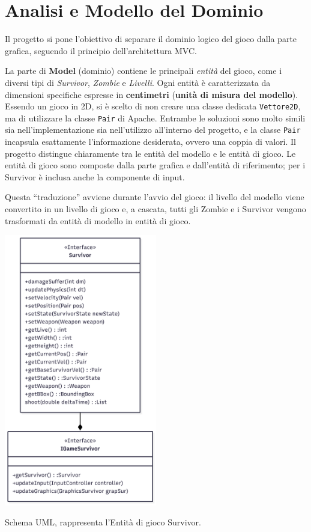 \documentclass[a4paper,12pt]{report}
\begin{document}
\section{Analisi e Modello del Dominio}

Il progetto si pone l'obiettivo di separare il dominio logico del gioco dalla parte grafica, seguendo il principio dell'architettura MVC.

La parte di \textbf{Model} (dominio) contiene le principali \emph{entità} del gioco, come i diversi tipi di \emph{Survivor}, \emph{Zombie} e \emph{Livelli}. Ogni entità è caratterizzata da dimensioni specifiche espresse in \textbf{centimetri} (\textbf{unità di misura del modello}).
%
Essendo un gioco in 2D, si è scelto di non creare una classe dedicata \texttt{Vettore2D}, ma di utilizzare la classe \texttt{Pair} di Apache. Entrambe le soluzioni sono molto simili sia nell’implementazione sia nell’utilizzo all’interno del progetto, e la classe \texttt{Pair} incapsula esattamente l’informazione desiderata, ovvero una coppia di valori.
%
Il progetto distingue chiaramente tra le entità del modello e le entità di gioco. Le entità di gioco sono composte dalla parte grafica e dall’entità di riferimento; per i Survivor è inclusa anche la componente di input.

Questa “traduzione” avviene durante l’avvio del gioco: il livello del modello viene convertito in un livello di gioco e, a cascata, tutti gli Zombie e i Survivor vengono trasformati da entità di modello in entità di gioco.

\begin{center}
\includegraphics[width=0.5\textwidth]{img/Survivor-SurvivorGame.png}
\end{center}
Schema UML, rappresenta l'Entità di gioco Survivor.
\end{document}
